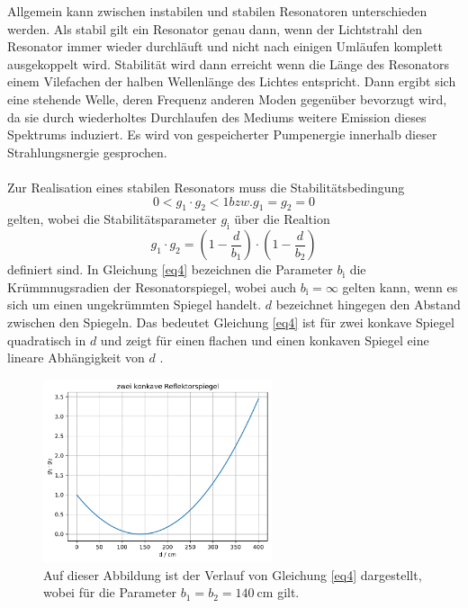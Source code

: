 Allgemein kann zwischen instabilen und stabilen Resonatoren unterschieden werden.
Als stabil gilt ein Resonator genau dann, wenn der Lichtstrahl den Resonator immer
wieder durchläuft und nicht nach einigen Umläufen komplett ausgekoppelt wird.
Stabilität wird dann erreicht wenn die Länge des Resonators einem Vilefachen der 
halben Wellenlänge des Lichtes entspricht. Dann ergibt sich eine stehende Welle,
deren Frequenz anderen Moden gegenüber bevorzugt wird, da sie durch wiederholtes 
Durchlaufen des Mediums weitere Emission dieses Spektrums induziert.
Es wird von gespeicherter Pumpenergie innerhalb dieser Strahlungsnergie gesprochen.\\\\
Zur Realisation eines stabilen Resonators muss die Stabilitätsbedingung 
\begin{equation}
    0 < g_1 \cdot g_2 <1 bzw. g_1 = g_2 = 0
    \label{eq3}
\end{equation}
gelten, wobei die Stabilitätsparameter $g_{\text{i}}$ über die Realtion 
\begin{equation}
    g_1 \cdot g_2  = \left( 1- \frac{d}{b_1} \right) \cdot \left(1 - \frac{d}{b_2} \right)
    \label{eq4}
\end{equation}
definiert sind. In Gleichung \eqref{eq4} bezeichnen die Parameter $b_{\text{i}}$ die 
Krümmnugsradien der Resonatorspiegel, wobei auch $b_{\text{i}} = \infty$ gelten kann, 
wenn es sich um einen ungekrümmten Spiegel handelt.
$d$ bezeichnet hingegen den Abstand zwischen den Spiegeln. 
Das bedeutet Gleichung \eqref{eq4} ist für zwei konkave Spiegel quadratisch in $d$ und 
zeigt für einen flachen und einen konkaven Spiegel eine lineare Abhängigkeit von $d$ \cite{1}.
\begin{figure}
    \centering
    \includegraphics[width=0.6\textwidth]{figure/d_quad.pdf}
    \caption{Auf dieser Abbildung ist der Verlauf von Gleichung \eqref{eq4} 
    dargestellt, wobei für die Parameter $b_{1}=b_{2} = \SI{140}{\centi\meter}$ gilt.}
    \label{abb1}
\end{figure}
